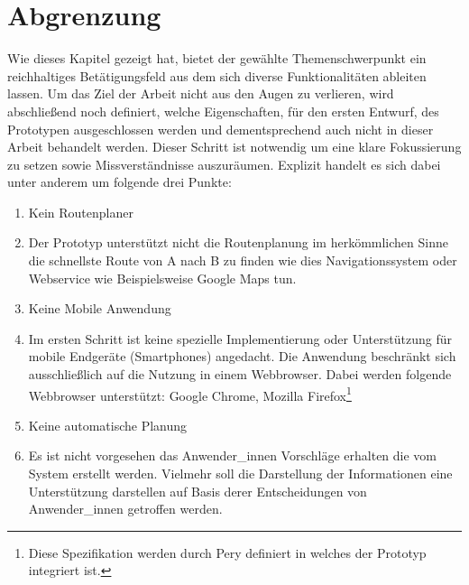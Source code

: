 \documentclass[Bachelorarbeit.tex]{subfiles}
\begin{document}
\section{Abgrenzung}
Wie dieses Kapitel gezeigt hat, bietet der gewählte Themenschwerpunkt ein reichhaltiges Betätigungsfeld aus dem sich diverse Funktionalitäten ableiten lassen. 
Um das Ziel der Arbeit nicht aus den Augen zu verlieren, wird abschließend noch definiert, welche Eigenschaften, für den ersten Entwurf, des Prototypen ausgeschlossen werden und dementsprechend auch nicht in dieser Arbeit behandelt werden. 
Dieser Schritt ist notwendig um eine klare Fokussierung zu setzen sowie Missverständnisse auszuräumen.
Explizit handelt es sich dabei unter anderem um folgende drei Punkte:
\begin{enumerate}
	\item Kein Routenplaner
	\item[] Der Prototyp unterstützt nicht die Routenplanung im herkömmlichen Sinne die schnellste Route von A nach B zu finden wie dies Navigationssystem oder Webservice wie Beispielsweise Google Maps tun.
	\item Keine Mobile Anwendung
	\item [] Im ersten Schritt ist keine spezielle Implementierung oder Unterstützung für mobile Endgeräte (Smartphones) angedacht. Die Anwendung beschränkt sich ausschließlich auf die Nutzung in einem Webbrowser. Dabei werden folgende Webbrowser unterstützt: Google Chrome, Mozilla Firefox\footnote{Diese Spezifikation werden durch Pery definiert in welches der Prototyp integriert ist.}
	\item Keine automatische Planung
	\item[] Es ist nicht vorgesehen das Anwender\_innen Vorschläge erhalten die vom System erstellt werden. Vielmehr soll die Darstellung der Informationen eine Unterstützung darstellen auf Basis derer Entscheidungen von Anwender\_innen getroffen werden.
\end{enumerate}
\end{document}
